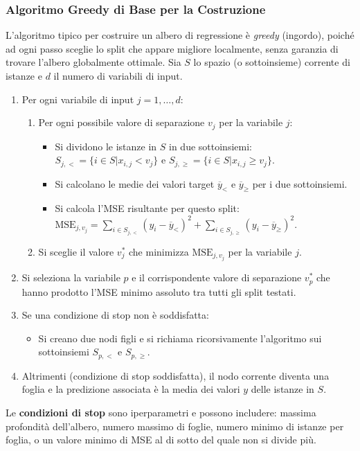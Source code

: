\documentclass{article}
\begin{document}
\subsubsection{Algoritmo Greedy di Base per la Costruzione}
L'algoritmo tipico per costruire un albero di regressione è \textit{greedy} (ingordo), poiché ad ogni passo sceglie lo split che appare migliore localmente, senza garanzia di trovare l'albero globalmente ottimale.
Sia $S$ lo spazio (o sottoinsieme) corrente di istanze e $d$ il numero di variabili di input.
\begin{enumerate}
    \item Per ogni variabile di input $j=1, \dots, d$:
          \begin{enumerate}
              \item Per ogni possibile valore di separazione $v_j$ per la variabile $j$:
                    \begin{itemize}
                        \item Si dividono le istanze in $S$ in due sottoinsiemi: $S_{j,<} = \{i \in S | x_{i,j} < v_j\}$ e $S_{j,\ge} = \{i \in S | x_{i,j} \ge v_j\}$.
                        \item Si calcolano le medie dei valori target $\overline{y}_{<}$ e $\overline{y}_{\ge}$ per i due sottoinsiemi.
                        \item Si calcola l'MSE risultante per questo split: $\text{MSE}_{j,v_j} = \sum_{i \in S_{j,<}} (y_i - \overline{y}_{<})^2 + \sum_{i \in S_{j,\ge}} (y_i - \overline{y}_{\ge})^2$.
                    \end{itemize}
              \item Si sceglie il valore $v_j^*$ che minimizza $\text{MSE}_{j,v_j}$ per la variabile $j$.
          \end{enumerate}
    \item Si seleziona la variabile $p$ e il corrispondente valore di separazione $v_p^*$ che hanno prodotto l'MSE minimo assoluto tra tutti gli split testati.
    \item Se una condizione di stop non è soddisfatta:
          \begin{itemize}
              \item Si creano due nodi figli e si richiama ricorsivamente l'algoritmo sui sottoinsiemi $S_{p,<}$ e $S_{p,\ge}$.
          \end{itemize}
    \item Altrimenti (condizione di stop soddisfatta), il nodo corrente diventa una foglia e la predizione associata è la media dei valori $y$ delle istanze in $S$.
\end{enumerate}
Le \textbf{condizioni di stop} sono iperparametri e possono includere: massima profondità dell'albero, numero massimo di foglie, numero minimo di istanze per foglia, o un valore minimo di MSE al di sotto del quale non si divide più.
\end{document}
